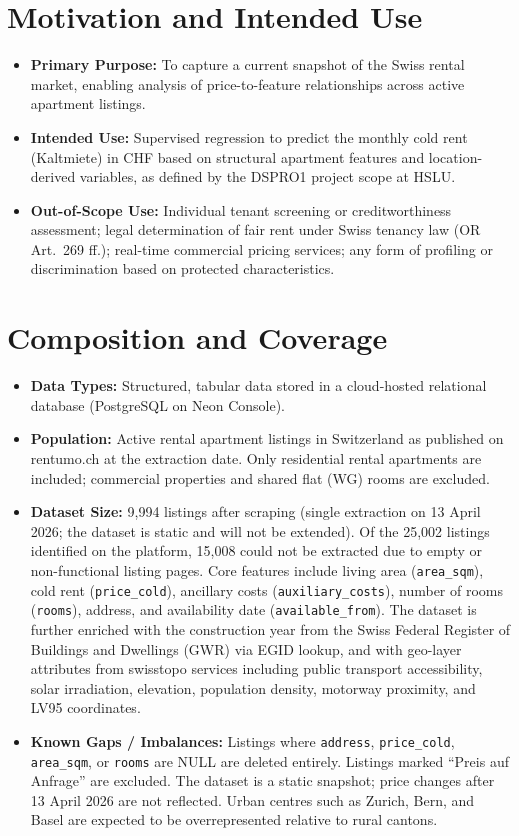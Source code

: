 \documentclass[11pt, a4paper]{article}
\begin{document}
\section{Motivation and Intended Use}
\begin{itemize}
    \item \textbf{Primary Purpose:} To capture a current snapshot of the Swiss rental market, enabling analysis of price-to-feature relationships across active apartment listings.
    \item \textbf{Intended Use:} Supervised regression to predict the monthly cold rent (Kaltmiete) in CHF based on structural apartment features and location-derived variables, as defined by the DSPRO1 project scope at HSLU.
    \item \textbf{Out-of-Scope Use:} Individual tenant screening or creditworthiness assessment; legal determination of fair rent under Swiss tenancy law (OR Art.\ 269 ff.); real-time commercial pricing services; any form of profiling or discrimination based on protected characteristics.
\end{itemize}

\section{Composition and Coverage}
\begin{itemize}
    \item \textbf{Data Types:} Structured, tabular data stored in a cloud-hosted relational database (PostgreSQL on Neon Console).
    \item \textbf{Population:} Active rental apartment listings in Switzerland as published on rentumo.ch at the extraction date. Only residential rental apartments are included; commercial properties and shared flat (WG) rooms are excluded.
    \item \textbf{Dataset Size:} 9{,}994 listings after scraping (single extraction on 13 April 2026; the dataset is static and will not be extended). Of the 25{,}002 listings identified on the platform, 15{,}008 could not be extracted due to empty or non-functional listing pages. Core features include living area (\texttt{area\_sqm}), cold rent (\texttt{price\_cold}), ancillary costs (\texttt{auxiliary\_costs}), number of rooms (\texttt{rooms}), address, and availability date (\texttt{available\_from}). The dataset is further enriched with the construction year from the Swiss Federal Register of Buildings and Dwellings (GWR) via EGID lookup, and with geo-layer attributes from swisstopo services including public transport accessibility, solar irradiation, elevation, population density, motorway proximity, and LV95 coordinates.
    \item \textbf{Known Gaps / Imbalances:} Listings where \texttt{address}, \texttt{price\_cold}, \texttt{area\_sqm}, or \texttt{rooms} are NULL are deleted entirely. Listings marked ``Preis auf Anfrage'' are excluded. The dataset is a static snapshot; price changes after 13 April 2026 are not reflected. Urban centres such as Zurich, Bern, and Basel are expected to be overrepresented relative to rural cantons.
\end{itemize}
\end{document}
